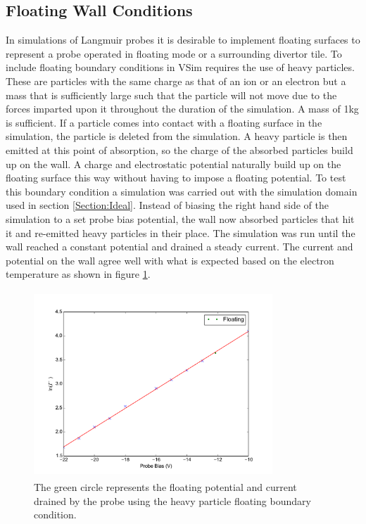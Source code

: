 \subsection{Floating Wall Conditions}
In simulations of Langmuir probes it is desirable to implement floating surfaces to represent a probe operated in floating mode or a surrounding divertor tile. To include floating boundary conditions in VSim requires the use of heavy particles. These are particles with the same charge as that of an ion or an electron but a mass that is sufficiently large such that the particle will not move due to the forces imparted upon it throughout the duration of the simulation. A mass of 1kg is sufficient. If a particle comes into contact with a floating surface in the simulation, the particle is deleted from the simulation. A heavy particle is then emitted at this point of absorption, so the charge of the absorbed particles build up on the wall. A charge and electrostatic potential naturally build up on the floating surface this way without having to impose a floating potential. To test this boundary condition a simulation was carried out with the simulation domain used in section \ref{Section:Ideal}. Instead of biasing the right hand side of the simulation to a set probe bias potential, the wall now absorbed particles that hit it and re-emitted heavy particles in their place. The simulation was run until the wall reached a constant potential and drained a steady current. The current and potential on the wall agree well with what is expected based on the electron temperature as shown in figure \ref{fig:floating_point1}.
\begin{figure}[H]
\centering
\includegraphics[height=7cm,width=0.8\textwidth]{floating_point.pdf}

\caption{The green circle represents the floating potential and current drained by the probe using the heavy particle floating boundary condition. }
\label{fig:floating_point1}
\end{figure}

